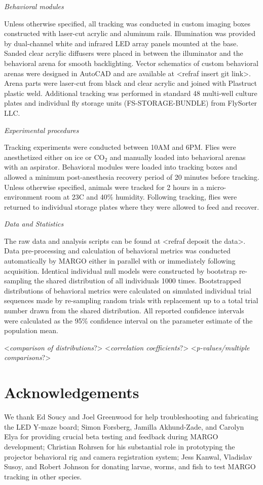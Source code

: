 \documentclass[10pt]{article}
\begin{document}
\begin{multicols}{2}
\textit{Behavioral modules}

Unless otherwise specified, all tracking was conducted in custom imaging boxes constructed with laser-cut acrylic and aluminum rails. Illumination was provided by dual-channel white and infrared LED array panels mounted at the base. Sanded clear acrylic diffusers were placed in between the illuminator and the behavioral arena for smooth backlighting. Vector schematics of custom behavioral arenas were designed in AutoCAD and are available at <refraf insert git link>. Arena parts were laser-cut from black and clear acrylic and joined with Plastruct plastic weld. Additional tracking was performed in standard 48 multi-well culture plates and individual fly storage units (FS-STORAGE-BUNDLE) from FlySorter LLC.

\textit{Experimental procedures}

Tracking experiments were conducted between 10AM and 6PM. Flies were anesthetized either on ice or CO$_{2}$ and manually loaded into behavioral arenas with an aspirator. Behavioral modules were loaded into tracking boxes and allowed a minimum post-anesthesia recovery period of 20 minutes before tracking. Unless otherwise specified, animals were tracked for 2 hours in a micro-environment room at 23\degree  C and 40\% humidity. Following tracking, flies were returned to individual storage plates where they were allowed to feed and recover.

\textit{Data and Statistics}

The raw data and analysis scripts can be found at <refraf deposit the data>. Data pre-processing and calculation of behavioral metrics was conducted automatically by MARGO either in parallel with or immediately following acquisition. Identical individual null models were constructed by bootstrap re-sampling the shared distribution of all individuals 1000 times. Bootstrapped distributions of behavioral metrics were calculated on simulated individual trial sequences made by re-sampling random trials with replacement up to a total trial number drawn from the shared distribution. All reported confidence intervals were calculated as the 95\% confidence interval on the parameter estimate of the population mean.

<\textit{comparison of distributions}?>
<\textit{correlation coefficients}?>
<\textit{p-values/multiple comparisons}?>

\section*{Acknowledgements}

We thank Ed Soucy and Joel Greenwood for help troubleshooting and fabricating the LED Y-maze board; Simon Forsberg, Jamilla Akhund-Zade, and Carolyn Elya for providing crucial beta testing and feedback during MARGO development; Christian Rohrsen for his substantial role in prototyping the projector behavioral rig and camera registration system; Jess Kanwal, Vladislav Susoy, and Robert Johnson for donating larvae, worms, and fish to test MARGO tracking in other species.

 
\end{multicols}
\end{document}

